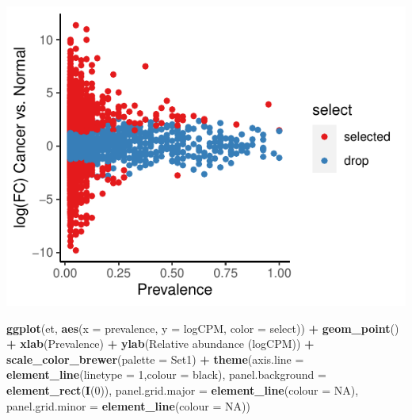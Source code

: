 \documentclass[
]{article}
\newenvironment{Shaded}{\begin{snugshade}}{\end{snugshade}}
\newcommand{\AttributeTok}[1]{\textcolor[rgb]{0.13,0.29,0.53}{#1}}
\newcommand{\ConstantTok}[1]{\textcolor[rgb]{0.56,0.35,0.01}{#1}}
\newcommand{\DecValTok}[1]{\textcolor[rgb]{0.00,0.00,0.81}{#1}}
\newcommand{\FunctionTok}[1]{\textcolor[rgb]{0.13,0.29,0.53}{\textbf{#1}}}
\newcommand{\NormalTok}[1]{#1}
\newcommand{\SpecialCharTok}[1]{\textcolor[rgb]{0.81,0.36,0.00}{\textbf{#1}}}
\newcommand{\StringTok}[1]{\textcolor[rgb]{0.31,0.60,0.02}{#1}}
\begin{document}
\includegraphics{workshop_files/figure-latex/unnamed-chunk-52-3.pdf}

\begin{Shaded}
\begin{Highlighting}[]

\FunctionTok{ggplot}\NormalTok{(et, }\FunctionTok{aes}\NormalTok{(}\AttributeTok{x =}\NormalTok{ prevalence, }\AttributeTok{y =}\NormalTok{ logCPM, }\AttributeTok{color =}\NormalTok{ select)) }\SpecialCharTok{+} \FunctionTok{geom\_point}\NormalTok{() }\SpecialCharTok{+}
  \FunctionTok{xlab}\NormalTok{(}\StringTok{\textquotesingle{}Prevalence\textquotesingle{}}\NormalTok{) }\SpecialCharTok{+} \FunctionTok{ylab}\NormalTok{(}\StringTok{\textquotesingle{}Relative abundance (logCPM)\textquotesingle{}}\NormalTok{) }\SpecialCharTok{+} 
  \FunctionTok{scale\_color\_brewer}\NormalTok{(}\AttributeTok{palette =} \StringTok{\textquotesingle{}Set1\textquotesingle{}}\NormalTok{) }\SpecialCharTok{+}
  \FunctionTok{theme}\NormalTok{(}\AttributeTok{axis.line =} \FunctionTok{element\_line}\NormalTok{(}\AttributeTok{linetype =} \DecValTok{1}\NormalTok{,}\AttributeTok{colour =} \StringTok{\textquotesingle{}black\textquotesingle{}}\NormalTok{),}
        \AttributeTok{panel.background =} \FunctionTok{element\_rect}\NormalTok{(}\FunctionTok{I}\NormalTok{(}\DecValTok{0}\NormalTok{)),}
        \AttributeTok{panel.grid.major =} \FunctionTok{element\_line}\NormalTok{(}\AttributeTok{colour =} \ConstantTok{NA}\NormalTok{),}
        \AttributeTok{panel.grid.minor =} \FunctionTok{element\_line}\NormalTok{(}\AttributeTok{colour =} \ConstantTok{NA}\NormalTok{))}
\end{Highlighting}
\end{Shaded}
\end{document}
